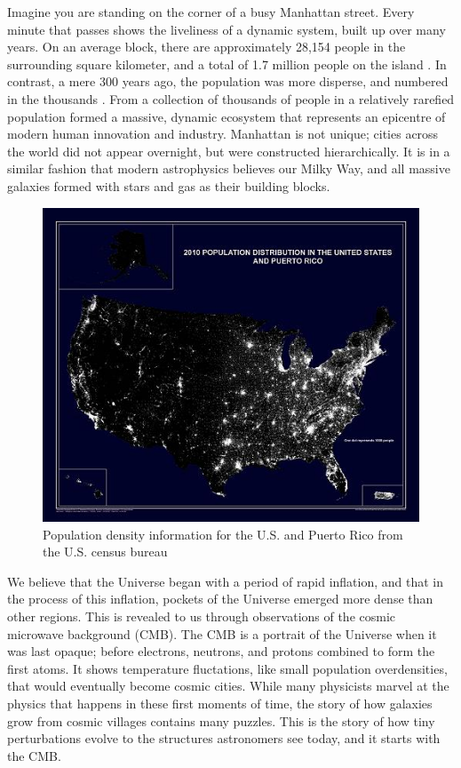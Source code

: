 Imagine you are standing on the corner of a busy Manhattan street. Every minute that passes shows the liveliness of a dynamic system, built up over many years. On an average block, there are approximately 28,154 people in the surrounding square kilometer, and a total of 1.7 million people on the island \citep{manhattan_population_density}. In contrast, a mere 300 years ago, the population was more disperse, and numbered in the thousands \citep{history_of_nyc}. From a collection of thousands of people in a relatively rarefied population formed a massive, dynamic ecosystem that represents an epicentre of modern human innovation and industry. Manhattan is not unique; cities across the world did not appear overnight, but were constructed hierarchically. It is in a similar fashion that modern astrophysics believes our Milky Way, and all massive galaxies formed with stars and gas as their building blocks.
\begin{figure}
	\includegraphics[width=\textwidth]{../figures/2010_census}
	\caption{Population density information for the U.S. and Puerto Rico from the U.S. census bureau \citep{2010_us_census}}
\end{figure}

We believe that the Universe began with a period of rapid inflation, and that in the process of this inflation, pockets of the Universe emerged more dense than other regions. This is revealed to us through observations of the cosmic microwave background (CMB). The CMB is a portrait of the Universe when it was last opaque; before electrons, neutrons, and protons combined to form the first atoms. It shows temperature fluctations, like small population overdensities, that would eventually become cosmic cities.  While many physicists marvel at the physics that happens in these first moments of time, the story of how galaxies grow from cosmic villages contains many puzzles. This is the story of how tiny perturbations evolve to the structures astronomers see today, and it starts with the CMB.

